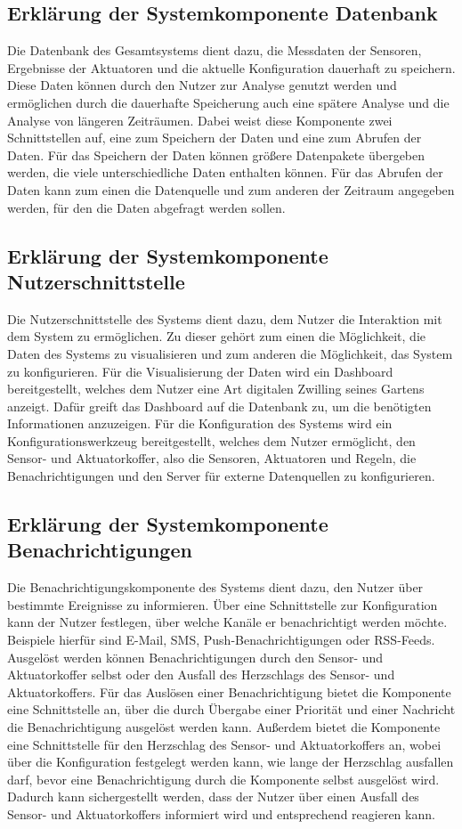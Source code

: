 \subsection{Erklärung der Systemkomponente Datenbank}
Die Datenbank des Gesamtsystems dient dazu, die Messdaten der Sensoren, Ergebnisse der Aktuatoren und die aktuelle Konfiguration dauerhaft zu speichern.
Diese Daten können durch den Nutzer zur Analyse genutzt werden und ermöglichen durch die dauerhafte Speicherung auch eine spätere Analyse und die Analyse von längeren Zeiträumen.
Dabei weist diese Komponente zwei Schnittstellen auf, eine zum Speichern der Daten und eine zum Abrufen der Daten.
Für das Speichern der Daten können größere Datenpakete übergeben werden, die viele unterschiedliche Daten enthalten können.
Für das Abrufen der Daten kann zum einen die Datenquelle und zum anderen der Zeitraum angegeben werden, für den die Daten abgefragt werden sollen.


\subsection{Erklärung der Systemkomponente Nutzerschnittstelle}
Die Nutzerschnittstelle des Systems dient dazu, dem Nutzer die Interaktion mit dem System zu ermöglichen.
Zu dieser gehört zum einen die Möglichkeit, die Daten des Systems zu visualisieren und zum anderen die Möglichkeit, das System zu konfigurieren.
Für die Visualisierung der Daten wird ein Dashboard bereitgestellt, welches dem Nutzer eine Art digitalen Zwilling seines Gartens anzeigt.
Dafür greift das Dashboard auf die Datenbank zu, um die benötigten Informationen anzuzeigen.
Für die Konfiguration des Systems wird ein Konfigurationswerkzeug bereitgestellt, welches dem Nutzer ermöglicht, den Sensor- und Aktuatorkoffer, also die Sensoren, Aktuatoren und Regeln, die Benachrichtigungen und den Server für externe Datenquellen zu konfigurieren.


\subsection{Erklärung der Systemkomponente Benachrichtigungen}
Die Benachrichtigungskomponente des Systems dient dazu, den Nutzer über bestimmte Ereignisse zu informieren.
Über eine Schnittstelle zur Konfiguration kann der Nutzer festlegen, über welche Kanäle er benachrichtigt werden möchte.
Beispiele hierfür sind E-Mail, SMS, Push-Benachrichtigungen oder RSS-Feeds.
Ausgelöst werden können Benachrichtigungen durch den Sensor- und Aktuatorkoffer selbst oder den Ausfall des Herzschlags des Sensor- und Aktuatorkoffers.
Für das Auslösen einer Benachrichtigung bietet die Komponente eine Schnittstelle an, über die durch Übergabe einer Priorität und einer Nachricht die Benachrichtigung ausgelöst werden kann.
Außerdem bietet die Komponente eine Schnittstelle für den Herzschlag des Sensor- und Aktuatorkoffers an, wobei über die Konfiguration festgelegt werden kann, wie lange der Herzschlag ausfallen darf, bevor eine Benachrichtigung durch die Komponente selbst ausgelöst wird.
Dadurch kann sichergestellt werden, dass der Nutzer über einen Ausfall des Sensor- und Aktuatorkoffers informiert wird und entsprechend reagieren kann.


